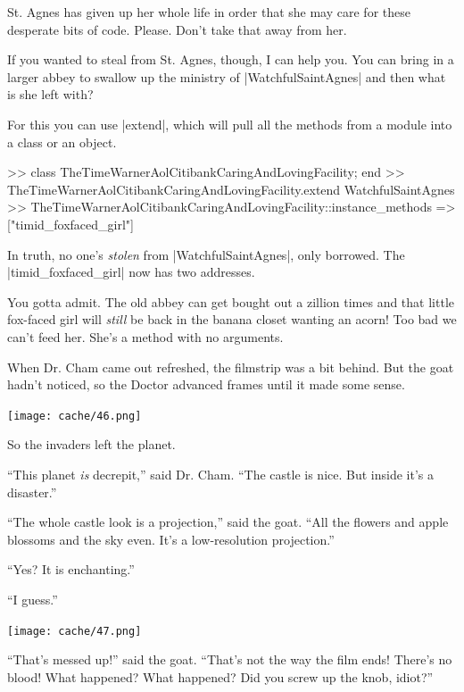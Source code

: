 \documentclass[12pt,twoside]{report}
\begin{document}
St. Agnes has given up her whole life in order that she may care for
these desperate bits of code. Please.  Don't take that away from her.

If you wanted to steal from St. Agnes, though, I can help you. You can
bring in a larger abbey to swallow up the ministry of
\rubyinline|WatchfulSaintAgnes| and then what is she
left with?

For this you can use \rubyinline|extend|, which will
pull all the methods from a module into a class or an object.


\begin{consolecode}

 >> class TheTimeWarnerAolCitibankCaringAndLovingFacility; end
 >> TheTimeWarnerAolCitibankCaringAndLovingFacility.extend WatchfulSaintAgnes
 >> TheTimeWarnerAolCitibankCaringAndLovingFacility::instance_methods
 => ["timid_foxfaced_girl"]

\end{consolecode}


In truth, no one's {\em stolen} from
\rubyinline|WatchfulSaintAgnes|, only borrowed.  The
\rubyinline|timid_foxfaced_girl| now has two
addresses.

You gotta admit.  The old abbey can get bought out a zillion times and
that little fox-faced girl will {\em still} be back in the banana
closet wanting an acorn!  Too bad we can't feed her. She's a method
with no arguments.

When Dr. Cham came out refreshed, the filmstrip was a bit behind.  But
the goat hadn't noticed, so the Doctor advanced frames until it made
some sense.

\newpage

	\texttt{[image: cache/46.png]}

So the invaders left the planet.

``This planet {\em is} decrepit,'' said Dr. Cham.  ``The castle is
nice.  But inside it's a disaster.''

``The whole castle look is a projection,'' said the goat.  ``All the
flowers and apple blossoms and the sky even.  It's a low-resolution
projection.''

``Yes?  It is enchanting.''

``I guess.''

	\texttt{[image: cache/47.png]}

``That's messed up!'' said the goat.  ``That's not the way the film
        ends! There's no blood!  What happened?  What happened?  Did
        you screw up the knob, idiot?''
\end{document}
